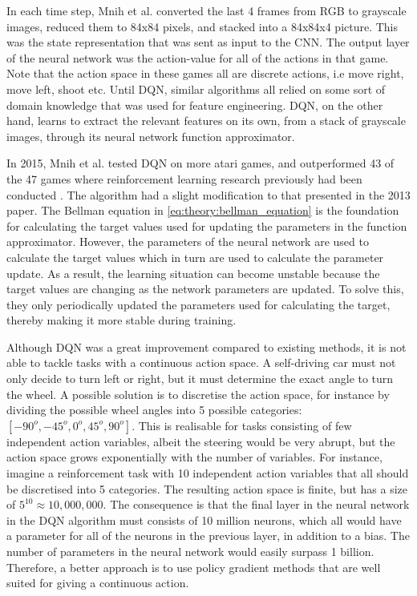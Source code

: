 \documentclass[class=book, crop=false]{standalone}
\begin{document}
In each time step, Mnih et al. converted the last 4 frames from RGB to grayscale images, reduced them to 84x84 pixels, and stacked into a 84x84x4 picture. This was the state representation that was sent as input to the CNN. The output layer of the neural network was the action-value for all of the actions in that game. Note that the action space in these games all are discrete actions, i.e move right, move left, shoot etc. Until DQN, similar algorithms all relied on some sort of domain knowledge that was used for feature engineering. DQN, on the other hand, learns to extract the relevant features on its own, from a stack of grayscale images, through its neural network function approximator.

In 2015, Mnih et al. tested DQN on more atari games, and outperformed 43 of the 47 games where reinforcement learning research previously had been conducted \cite{mnih2015_humanlevel}. The algorithm had a slight modification to that presented in the 2013 paper. The Bellman equation in \eqref{eq:theory:bellman_equation} is the foundation for calculating the target values used for updating the parameters in the function approximator. However, the parameters of the neural network are used to calculate the target values which in turn are used to calculate the parameter update. As a result, the learning situation can become unstable because the target values are changing as the network parameters are updated. To solve this, they only periodically updated the parameters used for calculating the target, thereby making it more stable during training. 


Although DQN was a great improvement compared to existing methods, it is not able to tackle tasks with a continuous action space. A self-driving car must not only decide to turn left or right, but it must determine the exact angle to turn the wheel. A possible solution is to discretise the action space, for instance by dividing the possible wheel angles into 5 possible categories: $[-90^{o},-45^{o},0^{o},45^{o},90^{o}]$. This is realisable for tasks consisting of few independent action variables, albeit the steering would be very abrupt, but the action space grows exponentially with the number of variables. For instance, imagine a reinforcement task with 10 independent action variables that all should be discretised into 5 categories. The resulting action space is finite, but has a size of $5^{10} \approx 10, 000,000$. The consequence is that the final layer in the neural network in the DQN algorithm must consists of 10 million neurons, which all would have a parameter for all of the neurons in the previous layer, in addition to a bias. The number of parameters in the neural network would easily surpass 1 billion. Therefore, a better approach is to use policy gradient methods that are well suited for giving a continuous action. 
\end{document}
